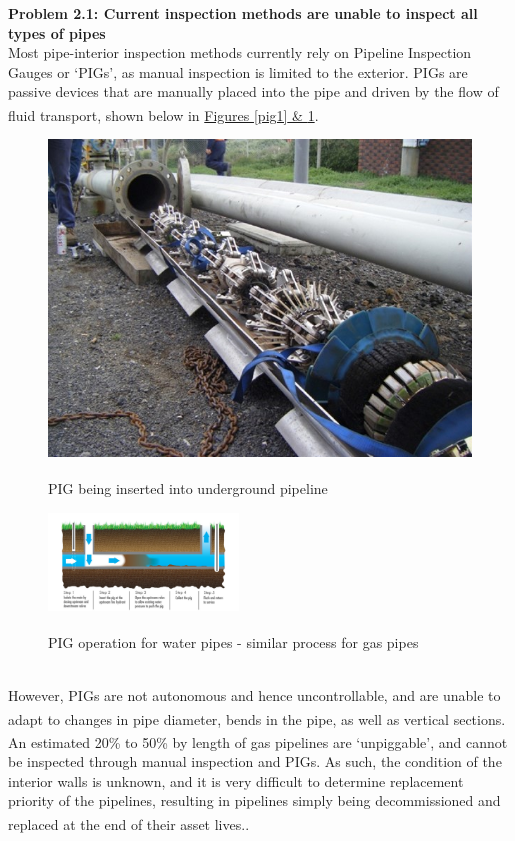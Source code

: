 \documentclass[11pt]{article}		%
\newlength{\imageheight}	 %
\newcommand{\supercite}[1]{\textsuperscript{\cite{#1}}}		%
\begin{document}
	\textbf{Problem 2.1: Current inspection methods are unable to inspect all types of pipes }
	\\Most pipe-interior inspection methods currently rely on Pipeline Inspection Gauges or ‘PIGs’, as manual inspection is limited to the exterior. PIGs are passive devices that are manually placed into the pipe and driven by the flow of fluid transport\supercite{pigging}, shown below in \hyperref[pig1]{Figures \ref*{pig1} \& \ref*{pig2}}.
		\begin{figure}[h]
					\centering
					\begin{multicols}{2}
						\includegraphics[height=\imageheight]{pig1.jpg}
						\caption{PIG being inserted into underground pipeline\supercite{pigimage1}}
						\label{pig1}
						\columnbreak
						\includegraphics[width=0.45\textwidth]{pig2.jpg}
						\caption{PIG operation for water pipes - similar process for gas pipes \supercite{pigimage2}}
						\label{pig2}
					\end{multicols}
				\end{figure}
    \\  However, PIGs are not autonomous and hence uncontrollable, and are unable to adapt to changes in pipe diameter, bends in the pipe, as well as vertical sections\supercite{piglimitations}. An estimated 20\% to 50\% by length of gas pipelines are ‘unpiggable’\supercite{unpiggable}, and cannot be inspected through manual inspection and PIGs. As such, the condition of the interior walls is unknown, and it is very difficult to determine replacement priority of the pipelines, resulting in pipelines simply being decommissioned and replaced at the end of their asset lives.\supercite{decommission}.
    
\end{document}
